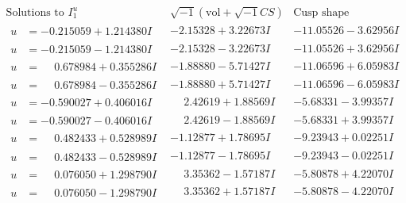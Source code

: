 \documentclass[1p]{elsarticle_modified}
\theoremstyle{definition}
\newcommand{\I}{\sqrt{-1}}
\begin{document}
$$\begin{array}{c|c|c}  
\text{Solutions to }I^u_{1}& \I (\text{vol} + \sqrt{-1}CS) & \text{Cusp shape}\\
 \hline 
\begin{aligned}
u &= -0.215059 + 1.214380 I\end{aligned}
 & -2.15328 + 3.22673 I & -11.05526 - 3.62956 I \\ \hline\begin{aligned}
u &= -0.215059 - 1.214380 I\end{aligned}
 & -2.15328 - 3.22673 I & -11.05526 + 3.62956 I \\ \hline\begin{aligned}
u &= \phantom{-}0.678984 + 0.355286 I\end{aligned}
 & -1.88880 - 5.71427 I & -11.06596 + 6.05983 I \\ \hline\begin{aligned}
u &= \phantom{-}0.678984 - 0.355286 I\end{aligned}
 & -1.88880 + 5.71427 I & -11.06596 - 6.05983 I \\ \hline\begin{aligned}
u &= -0.590027 + 0.406016 I\end{aligned}
 & \phantom{-}2.42619 + 1.88569 I & -5.68331 - 3.99357 I \\ \hline\begin{aligned}
u &= -0.590027 - 0.406016 I\end{aligned}
 & \phantom{-}2.42619 - 1.88569 I & -5.68331 + 3.99357 I \\ \hline\begin{aligned}
u &= \phantom{-}0.482433 + 0.528989 I\end{aligned}
 & -1.12877 + 1.78695 I & -9.23943 + 0.02251 I \\ \hline\begin{aligned}
u &= \phantom{-}0.482433 - 0.528989 I\end{aligned}
 & -1.12877 - 1.78695 I & -9.23943 - 0.02251 I \\ \hline\begin{aligned}
u &= \phantom{-}0.076050 + 1.298790 I\end{aligned}
 & \phantom{-}3.35362 - 1.57187 I & -5.80878 + 4.22070 I \\ \hline\begin{aligned}
u &= \phantom{-}0.076050 - 1.298790 I\end{aligned}
 & \phantom{-}3.35362 + 1.57187 I & -5.80878 - 4.22070 I \\ \hline\begin{aligned}

\end{aligned}
\end{array}$$
\end{document}
